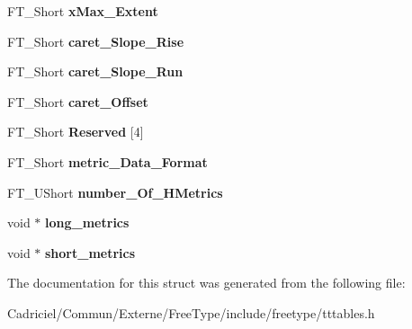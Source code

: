 \begin{DoxyCompactItemize}
\item 
F\+T\+\_\+\+Short {\bfseries x\+Max\+\_\+\+Extent}\hypertarget{struct_t_t___hori_header___ab483cb323f9adc9d959209a42eb19957}{}\label{struct_t_t___hori_header___ab483cb323f9adc9d959209a42eb19957}

\item 
F\+T\+\_\+\+Short {\bfseries caret\+\_\+\+Slope\+\_\+\+Rise}\hypertarget{struct_t_t___hori_header___aeb43d92f56de424d8f28bd389973eca4}{}\label{struct_t_t___hori_header___aeb43d92f56de424d8f28bd389973eca4}

\item 
F\+T\+\_\+\+Short {\bfseries caret\+\_\+\+Slope\+\_\+\+Run}\hypertarget{struct_t_t___hori_header___acce162ae0554006c11a3383bd3454d69}{}\label{struct_t_t___hori_header___acce162ae0554006c11a3383bd3454d69}

\item 
F\+T\+\_\+\+Short {\bfseries caret\+\_\+\+Offset}\hypertarget{struct_t_t___hori_header___a791ad767d54cc87e84d9b03d6739f0eb}{}\label{struct_t_t___hori_header___a791ad767d54cc87e84d9b03d6739f0eb}

\item 
F\+T\+\_\+\+Short {\bfseries Reserved} \mbox{[}4\mbox{]}\hypertarget{struct_t_t___hori_header___af2a2b374d8f81771fb75d3bdc96bcbf7}{}\label{struct_t_t___hori_header___af2a2b374d8f81771fb75d3bdc96bcbf7}

\item 
F\+T\+\_\+\+Short {\bfseries metric\+\_\+\+Data\+\_\+\+Format}\hypertarget{struct_t_t___hori_header___a0ed857e9629d2dfb5350a6b5976bf933}{}\label{struct_t_t___hori_header___a0ed857e9629d2dfb5350a6b5976bf933}

\item 
F\+T\+\_\+\+U\+Short {\bfseries number\+\_\+\+Of\+\_\+\+H\+Metrics}\hypertarget{struct_t_t___hori_header___aac3ecb9ba7c13436a663b91765e89647}{}\label{struct_t_t___hori_header___aac3ecb9ba7c13436a663b91765e89647}

\item 
void $\ast$ {\bfseries long\+\_\+metrics}\hypertarget{struct_t_t___hori_header___a3eeb5766b461e9563b659a30e775fcc2}{}\label{struct_t_t___hori_header___a3eeb5766b461e9563b659a30e775fcc2}

\item 
void $\ast$ {\bfseries short\+\_\+metrics}\hypertarget{struct_t_t___hori_header___ae39107c4cfc3e7c1871dbb304bbe4a5a}{}\label{struct_t_t___hori_header___ae39107c4cfc3e7c1871dbb304bbe4a5a}

\end{DoxyCompactItemize}


The documentation for this struct was generated from the following file\+:\begin{DoxyCompactItemize}
\item 
Cadriciel/\+Commun/\+Externe/\+Free\+Type/include/freetype/tttables.\+h\end{DoxyCompactItemize}
